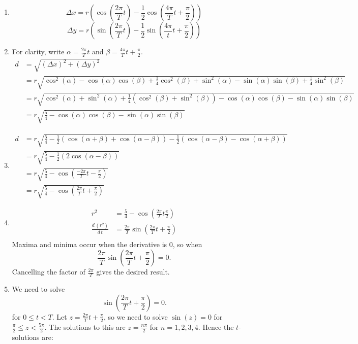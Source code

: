 \documentclass{article}
\begin{document}
\begin{enumerate}
\item \[\Delta x=r\left(\cos\left(\frac{2\pi}{T}t\right)-\frac{1}{2}\cos\left(\frac{4\pi}{T}t+\frac{\pi}{2}\right)\right)\]
	\[\Delta y=r\left(\sin\left(\frac{2\pi}{T}t\right)-\frac{1}{2}\sin\left(\frac{4\pi}{t}t+\frac{\pi}{2}\right)\right)\]
\item For clarity, write $\alpha=\frac{2\pi}{T}t$ and $\beta=\frac{4\pi}{T}t+\frac{\pi}{2}.$
	\begin{align*}
	d&=\sqrt{(\Delta x)^2+(\Delta y)^2}\\
	&= r\sqrt{\cos^2(\alpha)-\cos(\alpha)\cos(\beta)+\frac{1}{4}\cos^2(\beta)+\sin^2(\alpha)-\sin(\alpha)\sin(\beta)+\frac{1}{4}\sin^2(\beta)}\\
	&=r\sqrt{\cos^2(\alpha)+\sin^2(\alpha) + \frac{1}{4}(\cos^2(\beta)+\sin^2(\beta))-\cos(\alpha)\cos(\beta)-\sin(\alpha)\sin(\beta)}\\
	&=r\sqrt{\frac{5}{4}-\cos(\alpha)\cos(\beta)-\sin(\alpha)\sin(\beta)}
	\end{align*}
\item \begin{align*}
	d&=r\sqrt{\frac{5}{4}-\frac{1}{2}(\cos(\alpha+\beta)+\cos(\alpha-\beta))-\frac{1}{2}(\cos(\alpha-\beta)-\cos(\alpha+\beta))}\\
	&=r\sqrt{\frac{5}{4}-\frac{1}{2}(2\cos(\alpha-\beta))}\\
	&= r\sqrt{\frac{5}{4}-\cos\left(\frac{-2\pi}{T}t-\frac{\pi}{2}\right)}\\
	&= r\sqrt{\frac{5}{4}-\cos\left(\frac{2\pi}{T}t+\frac{\pi}{2}\right)}
	\end{align*}
\item \begin{align*}
	r^2&=\frac{5}{4}-\cos\left(\frac{2\pi}{T}t\frac{\pi}{2}\right)\\
	\frac{d\,(r^2)}{d\,t}&=\frac{2\pi}{T}\sin\left(\frac{2\pi}{T}t+\frac{\pi}{2}\right)\\
	\end{align*}
	Maxima and minima occur when the derivative is 0, so when
	\[\frac{2\pi}{T}\sin\left(\frac{2\pi}{T}t+\frac{\pi}{2}\right)=0.\]
	Cancelling the factor of $\frac{2\pi}{T}$ gives the desired result.
\item We need to solve
	\[\sin\left(\frac{2\pi}{T}t+\frac{\pi}{2}\right)=0.\]
	for $0\leq t<T$. Let $z=\frac{2\pi}{T}t+\frac{\pi}{2}$, so we need to solve $\sin(z)=0$ for $\frac{\pi}{2}\leq z<\frac{5\pi}{2}$.
	The solutions to this are $z=\frac{n\pi}{2}$ for $n=1,2,3,4$. Hence the $t$-solutions are:

\end{enumerate}
\end{document}
